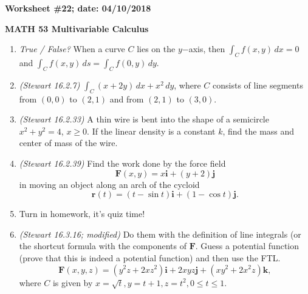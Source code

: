 \documentclass{article}
\newcommand{\ii}{\mathbf{i}}
\newcommand{\jj}{\mathbf{j}}
\newcommand{\kk}{\mathbf{k}}
\begin{document}
{\bf Worksheet \#22; date: 04/10/2018}

{\bf MATH 53 Multivariable Calculus}

\begin{enumerate}
\item {\em True / False?} When a curve $C$ lies on the $y$−axis, then $\int_C f(x, y) \,dx = 0$ and $\int_C f(x,y) \,ds = \int_C f(0,y) \,dy$.

\item {\em (Stewart 16.2.7)} $\int_C (x+2y) \,dx + x^2 \,dy$, where $C$ consists of line segments from $(0, 0)$ to $(2, 1)$ and from $(2, 1)$ to $(3, 0)$.

\item {\em (Stewart 16.2.33)} A thin wire is bent into the shape of a semicircle $x^2 + y^2 = 4$, $x \ge 0$. If the linear density is a constant $k$, find the mass and center of mass of the wire.

\item {\em (Stewart 16.2.39)} Find the work done by the force field
\[
\mathbf{F}(x, y) = x \ii + (y+2) \jj
\]
in moving an object along an arch of the cycloid
\[
\mathbf{r}(t) = (t - \sin t) \ii + (1 - \cos t) \jj.
\]

\item Turn in homework, it's quiz time!

\item {\em (Stewart 16.3.16; modified)} Do them with the definition of line integrals (or the shortcut formula with the components of $\mathbf{F}$. Guess a potential function (prove that this is indeed a potential function) and then use the FTL.
\[
\mathbf{F}(x, y, z) = (y^2 z + 2xz^2) \ii + 2xyz \jj + (xy^2 + 2x^2 z) \kk,
\]
where $C$ is given by $x = \sqrt{t}, y = t + 1, z = t^2, 0 \le t \le 1$.
\end{enumerate}
\end{document}

